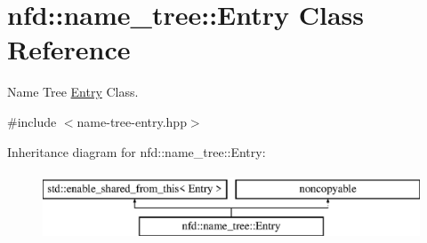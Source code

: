 \hypertarget{classnfd_1_1name__tree_1_1Entry}{}\section{nfd\+:\+:name\+\_\+tree\+:\+:Entry Class Reference}
\label{classnfd_1_1name__tree_1_1Entry}


Name Tree \hyperlink{classnfd_1_1name__tree_1_1Entry}{Entry} Class.  




{\ttfamily \#include $<$name-\/tree-\/entry.\+hpp$>$}

Inheritance diagram for nfd\+:\+:name\+\_\+tree\+:\+:Entry\+:\begin{figure}[H]
\begin{center}
\leavevmode
\includegraphics[height=2.000000cm]{classnfd_1_1name__tree_1_1Entry}
\end{center}
\end{figure}
